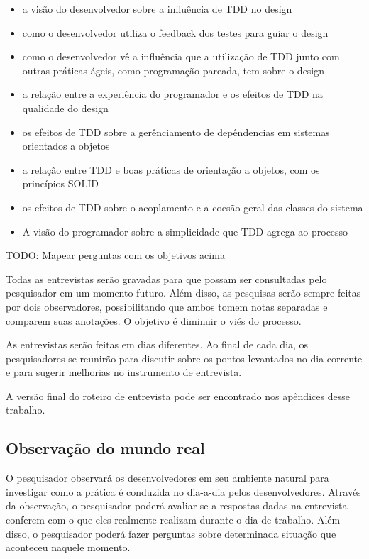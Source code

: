 \begin{itemize}
	\item a visão do desenvolvedor sobre a influência de TDD no design
	\item como o desenvolvedor utiliza o feedback dos testes para guiar o design
	\item como o desenvolvedor vê a influência que a utilização de TDD junto com outras práticas ágeis, como programação pareada, tem sobre o design
	\item a relação entre a experiência do programador e os efeitos de TDD na qualidade do design
	\item os efeitos de TDD sobre a gerênciamento de depêndencias em sistemas orientados a objetos
	\item a relação entre TDD e boas práticas de orientação a objetos, com os princípios SOLID \cite{bob-martin}
	\item os efeitos de TDD sobre o acoplamento e a coesão geral das classes do sistema
	\item A visão do programador sobre a simplicidade que TDD agrega ao processo
\end{itemize} 

TODO: Mapear perguntas com os objetivos acima

Todas as entrevistas serão gravadas para que possam ser consultadas pelo pesquisador em um momento futuro. Além disso,
as pesquisas serão sempre feitas por dois observadores, possibilitando que ambos tomem notas separadas e comparem
suas anotações. O objetivo é diminuir o viés do processo.

As entrevistas serão feitas em dias diferentes. Ao final de cada dia, os pesquisadores se reunirão para discutir
sobre os pontos levantados no dia corrente e para sugerir melhorias no instrumento de entrevista. 

A versão final do roteiro de entrevista pode ser encontrado nos apêndices desse trabalho.

\subsection{Observação do mundo real}
\label{sec:planejamento-estrategia-observacao}

O pesquisador observará os desenvolvedores em seu ambiente natural para investigar como a 
prática é conduzida no dia-a-dia pelos desenvolvedores. Através da observação, o pesquisador poderá avaliar se
a respostas dadas na entrevista conferem com o que eles realmente realizam durante o dia de trabalho. Além disso, o pesquisador
poderá fazer perguntas sobre determinada situação que aconteceu naquele momento.

